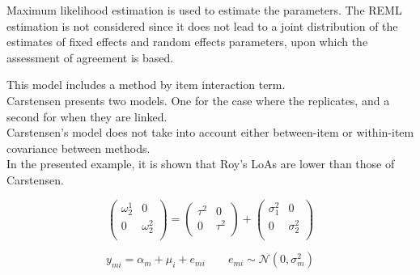 \documentclass[12pt, a4paper]{report}
\theoremstyle{plain}
\theoremstyle{definition}
\theoremstyle{remark}
\begin{document}
Maximum likelihood estimation is used to estimate the parameters.
The REML estimation is not considered since it does not lead to a
joint distribution of the estimates of fixed effects and random
effects parameters, upon which the assessment of agreement is
based.







%

%


This model includes a method by item interaction term.\\

Carstensen presents two models. One for the case where the replicates, and a second for when they are linked.\\
Carstensen's model does not take into account either between-item or within-item covariance between methods.\\
In the presented example, it is shown that Roy's LoAs are lower than those of Carstensen.




\[\left(\begin{array}{cc}
\omega^1_2  & 0 \\
0 & \omega^2_2 \\
\end{array}  \right)
=  \left(
\begin{array}{cc}
\tau^2  & 0 \\
0 & \tau^2 \\
\end{array} \right)+
\left(
\begin{array}{cc}
\sigma^2_1  & 0 \\
0 & \sigma^2_2 \\
\end{array}\right)
\]






%




%

\begin{equation}
y_{mi}  = \alpha_{m} + \mu_{i} + e_{mi} \qquad  e_{mi} \sim \mathcal{N}(0,\sigma^{2}_{m})
\end{equation}
\end{document}
